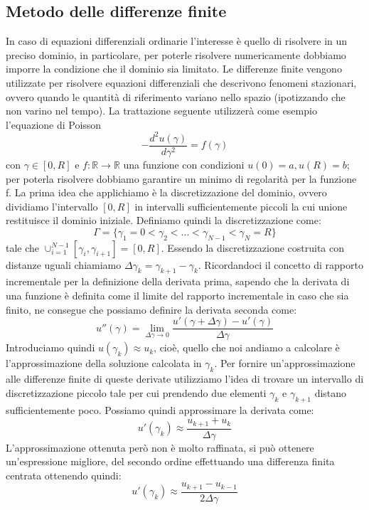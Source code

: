 \subsection{Metodo delle differenze finite}\label{appendix:diff}
In caso di equazioni differenziali ordinarie l'interesse è quello di risolvere in un preciso dominio, in particolare, per poterle risolvere numericamente dobbiamo imporre la condizione che il dominio sia limitato. Le differenze finite vengono utilizzate per risolvere equazioni differenziali che descrivono fenomeni stazionari, ovvero quando le quantità di riferimento variano nello spazio (ipotizzando che non varino nel tempo). La trattazione seguente utilizzerà come esempio l'equazione di Poisson
\begin{equation}
- \frac{d^2 u(\gamma)}{d\gamma^2}  =f(\gamma)
\end{equation}
con $\gamma\in[0,R]$ e $f:\mathbb{R}\rightarrow \mathbb{R}$ una funzione con condizioni $u(0)=a, u(R)=b$; per poterla risolvere dobbiamo garantire un minimo di regolarità per la funzione f. La prima idea che applichiamo è la discretizzazione del dominio, ovvero dividiamo l'intervallo $[0,R]$ in intervalli sufficientemente piccoli la cui unione restituisce il dominio iniziale. Definiamo quindi la discretizzazione come:
\begin{equation}
\Gamma = \{\gamma_1 = 0 < \gamma_2 < \dots < \gamma_{N-1} < \gamma_N = R\}
\end{equation}
tale che $\cup_{i=1}^{N-1} [\gamma_i,\gamma_{i+1}] = [0,R]$. Essendo la discretizzazione costruita con distanze uguali chiamiamo $\Delta \gamma_k = \gamma_{k+1} -\gamma_k$. Ricordandoci il concetto di rapporto incrementale per la definizione della derivata prima, sapendo che la derivata di una funzione è definita come il limite del rapporto incrementale in caso che sia finito, ne consegue che possiamo definire la derivata seconda come:
\begin{equation*}
u''(\gamma) = \lim_{\Delta\gamma \to 0} \frac{u'(\gamma+\Delta\gamma) -u'(\gamma)}{\Delta \gamma}
\end{equation*}
Introduciamo quindi $u(\gamma_k) \approx u_k$, cioè, quello che noi andiamo a calcolare è l'approssimazione della soluzione calcolata in $\gamma_k$. Per fornire un'approssimazione alle differenze finite di queste derivate utilizziamo l'idea di trovare un intervallo di discretizzazione piccolo tale per cui prendendo due elementi $\gamma_k$ e $\gamma_{k+1}$ distano sufficientemente poco. Possiamo quindi approssimare la derivata come:
\begin{equation}
u'(\gamma_k) \approx \frac{u_{k+1}+u_k}{\Delta \gamma}
\end{equation}
L'approssimazione ottenuta però non è molto raffinata, si può ottenere un'espressione migliore, del secondo ordine effettuando una differenza finita centrata ottenendo quindi:
\begin{equation}
u'(\gamma_k) \approx \frac{u_{k+1}-u_{k-1}}{2\Delta \gamma}
\end{equation}